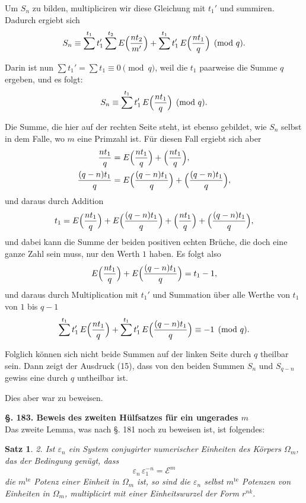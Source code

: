 \documentclass[12pt,a4paper]{article}
\newtheorem*{satz}{Satz}
\begin{document}
Um $S_n$ zu bilden, multipliciren wir diese Gleichung mit $t_1'$ und summiren. Dadurch ergiebt sich
\[
S_n \equiv \sum^{t_1} t_1' \sum^{t_2} E\Bigl(\frac{nt_2}{m'}\Bigr) + \sum^{t_1} t_1'\,E\Bigl(\frac{nt_1}{q}\Bigr) \pmod{q}.
\]

Darin ist nun $\sum t_1' = \sum t_1 \equiv 0 \pmod{q}$, weil die $t_1$ paarweise die Summe $q$ ergeben, und es folgt:
\begin{equation}\label{eq:182-15}
S_n \equiv \sum^{t_1} t_1'\,E\Bigl(\frac{nt_1}{q}\Bigr) \pmod{q}.
\end{equation}

Die Summe, die hier auf der rechten Seite steht, ist ebenso gebildet, wie $S_n$ selbst in dem Falle, wo $m$ eine Primzahl ist. Für diesen Fall ergiebt sich aber
\begin{align*}
\frac{nt_1}{q} &= E\Bigl(\frac{nt_1}{q}\Bigr) + \Bigl(\frac{nt_1}{q}\Bigr),\\
\frac{(q-n)t_1}{q} &= E\Bigl(\frac{(q-n)t_1}{q}\Bigr) + \Bigl(\frac{(q-n)t_1}{q}\Bigr),
\end{align*}
und daraus durch Addition
\[
t_1 = E\Bigl(\frac{nt_1}{q}\Bigr) + E\Bigl(\frac{(q-n)t_1}{q}\Bigr) + \Bigl(\frac{nt_1}{q}\Bigr) + \Bigl(\frac{(q-n)t_1}{q}\Bigr),
\]
und dabei kann die Summe der beiden positiven echten Brüche, die doch eine ganze Zahl sein muss, nur den Werth $1$ haben. Es folgt also
\[
E\Bigl(\frac{nt_1}{q}\Bigr) + E\Bigl(\frac{(q-n)t_1}{q}\Bigr) = t_1 - 1,
\]
und daraus durch Multiplication mit $t_1'$ und Summation über alle Werthe von $t_1$ von $1$ bis $q-1$
\[
\sum^{t_1} t_1'\,E\Bigl(\frac{nt_1}{q}\Bigr) + \sum^{t_1} t_1'\,E\Bigl(\frac{(q-n)t_1}{q}\Bigr) \equiv -1 \pmod{q}.
\]

Folglich können sich nicht beide Summen auf der linken Seite durch $q$ theilbar sein. Dann zeigt der Ausdruck (15), dass von den beiden Summen $S_n$ und $S_{q-n}$ gewiss eine durch $q$ untheilbar ist.

Dies aber war zu beweisen.

\bigskip\noindent\textbf{\S. 183. Beweis des zweiten Hülfsatzes für ein ungerades $m$}\\[4pt]

Das zweite Lemma, was nach \S. 181 noch zu beweisen ist, ist folgendes:

\begin{satz}
2. Ist $\varepsilon_n$ ein System conjugirter numerischer Einheiten des Körpers $\Omega_m$, das der Bedingung genügt, dass
\begin{equation}\label{eq:183-1}
\varepsilon_n\,\varepsilon_1^{-n} = \mathcal{E}^m
\end{equation}
die $m^{\text{te}}$ Potenz einer Einheit in $\Omega_m$ ist, so sind die $\varepsilon_n$ selbst $m^{\text{te}}$ Potenzen von Einheiten in $\Omega_m$, multiplicirt mit einer Einheitswurzel der Form $r^{nk}$.
\end{satz}
\end{document}
